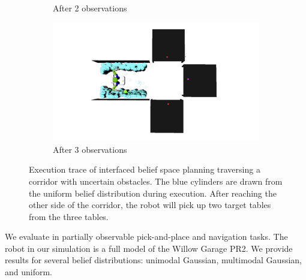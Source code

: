 \begin{figure}
\begin{subfigure}[b]{0.22\linewidth}
    \caption{After 2 observations}
    \label{fig:step3}
  \end{subfigure}
  \begin{subfigure}[b]{0.22\linewidth}
    \includegraphics[width=\textwidth]{corridor_images/3-observe.png}
    \caption{After 3 observations}
    \label{fig:step4}
  \end{subfigure}
  \caption{Execution trace of interfaced belief space planning
    traversing a corridor with uncertain obstacles.
    The blue cylinders are drawn from the uniform belief distribution
    during execution. After reaching the other side of the corridor,
    the robot will pick up two target tables from the three tables.}
  \label{fig:corridorimgs}
\end{figure}

We evaluate \ibsp{} in partially observable pick-and-place and navigation tasks.
The robot in our simulation is a full model of the Willow Garage PR2. We
provide results for several belief distributions: unimodal Gaussian, multimodal
Gaussian, and uniform.
